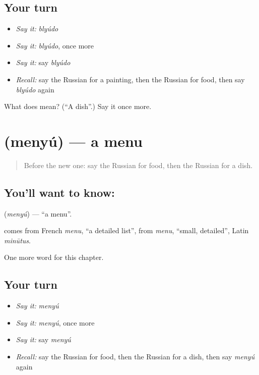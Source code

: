 \subsection*{Your turn}
\begin{itemize}
\raggedright
  \item \emph{Say it:} \emph{blyúdo}
  \item \emph{Say it:} \emph{blyúdo}, once more
  \item \emph{Say it:} say \emph{blyúdo}
  \item \emph{Recall:} say the Russian for a painting, then the Russian for food, then say \emph{blyúdo} again
\end{itemize}

\begin{tcolorbox}[breakable,colback=teal!4,colframe=teal!35!black,title={Before you move on}]
What does  mean? (\textquotedblleft{}A dish\textquotedblright{}.) Say it once more.
\end{tcolorbox}
\section[\texorpdfstring{\ru{меню} (menyú)}{меню (menyú)}]{ (menyú) — a menu}

\label{lesson:RU-C222-menyu}



\begin{quote}
Before the new one: say the Russian for food, then the Russian for a dish.
\end{quote}

\subsection*{You'll want to know: }
\textbf{} (\emph{menyú}) — \textquotedblleft{}a menu\textquotedblright{}.

\begin{cousinweb}
\textbf{} comes from French \emph{menu}, \textquotedblleft{}a detailed list\textquotedblright{}, from \emph{menu}, \textquotedblleft{}small, detailed\textquotedblright{}, Latin \emph{minūtus}.
\end{cousinweb}

\begin{grammarlens}[title={What you've built}]
One more word for this chapter.
\end{grammarlens}

\subsection*{Your turn}
\begin{itemize}
\raggedright
  \item \emph{Say it:} \emph{menyú}
  \item \emph{Say it:} \emph{menyú}, once more
  \item \emph{Say it:} say \emph{menyú}
  \item \emph{Recall:} say the Russian for food, then the Russian for a dish, then say \emph{menyú} again
\end{itemize}

